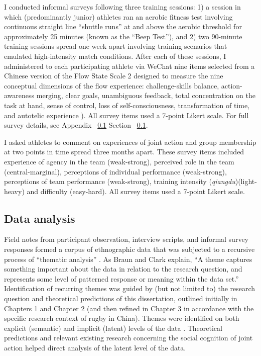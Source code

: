   I conducted informal surveys following three training sessions: 1) a session in which (predominantly junior) athletes ran an aerobic fitness test involving continuous straight line ``shuttle runs''  at and above the aerobic threshold for approximately 25 minutes (known as the ``Beep Test''), and 2) two 90-minute training sessions spread one week apart involving training scenarios that emulated high-intensity match conditions.  After each of these sessions, I administered to each participating athlete via WeChat nine items selected from a Chinese version of the Flow State Scale 2 \citep{Liu2012} designed to measure the nine conceptual dimensions of the flow experience: challenge-skills balance, action-awareness merging, clear goals, unambiguous feedback, total concentration on the task at hand, sense of control, loss of self-consciousness, transformation of time, and autotelic experience \citep{Csikszentmihalyi1990}).  All survey items used a 7-point Likert scale. For full survey details, see Appendix ~\ref{} Section ~\ref{}.

  I asked athletes to comment on experiences of joint action and group membership at two points in time spread three months apart.  These survey items included experience of agency in the team (weak-strong), perceived role in the team (central-marginal), perceptions of individual performance (weak-strong), perceptions of team performance (weak-strong), training intensity (\textit{qiangdu})(light-heavy) and difficulty (easy-hard).  All survey items used a 7-point Likert scale.


\subsection{Data analysis}
Field notes from participant observation, interview scripts, and informal survey responses formed a corpus of ethnographic data that was subjected to a recursive process of ``thematic analysis'' \citep{Braun2006}.  As Braun and Clark \textcite[10]{Braun2006} explain, ``A theme captures something important about the data in relation to the research question, and represents some level of patterned response or meaning within the data set.'' Identification of recurring themes was guided by (but not limited to) the research question and theoretical predictions of this dissertation, outlined initially in Chapters 1 and Chapter 2 (and then refined in Chapter 3 in accordance with the specific research context of rugby in China).  Themes were identified on both explicit (semantic) and implicit (latent) levels of the data \citep{Boyatzis1998}. Theoretical predictions and relevant existing research concerning the social cognition of joint action helped direct analysis of the latent level of the data.

